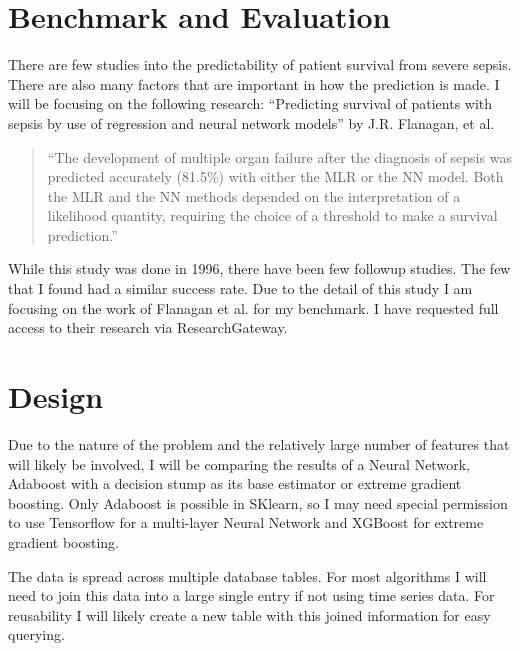 \documentclass[11pt]{article}
\begin{document}
\section{Benchmark and Evaluation}
There are few studies into the predictability of patient survival from severe sepsis. There are also many factors that are important in how the prediction is made. I will be focusing on the following research: ``Predicting survival of patients with sepsis by use of regression and neural network models'' by J.R. Flanagan, et al. \begin{quotation}
  ``The development of multiple organ failure after the diagnosis of sepsis was predicted accurately (81.5\%) with either the MLR or the NN model. Both the MLR and the NN methods depended on the interpretation of a likelihood quantity, requiring the choice of a threshold to make a survival prediction.''\cite{sepsisresearch}
\end{quotation}

While this study was done in 1996, there have been few followup studies. The few that I found had a similar success rate. Due to the detail of this study I am focusing on the work of Flanagan et al. for my benchmark. I have requested full access to their research via ResearchGateway.

\section{Design}
Due to the nature of the problem and the relatively large number of features that will likely be involved, I will be comparing the results of a Neural Network, Adaboost with a decision stump as its base estimator or extreme gradient boosting. Only Adaboost is possible in SKlearn, so I may need special permission to use Tensorflow for a multi-layer Neural Network and XGBoost for extreme gradient boosting.

The data is spread across multiple database tables. For most algorithms I will need to join this data into a large single entry if not using time series data. For reusability I will likely create a new table with this joined information for easy querying.


{}

\end{document}

